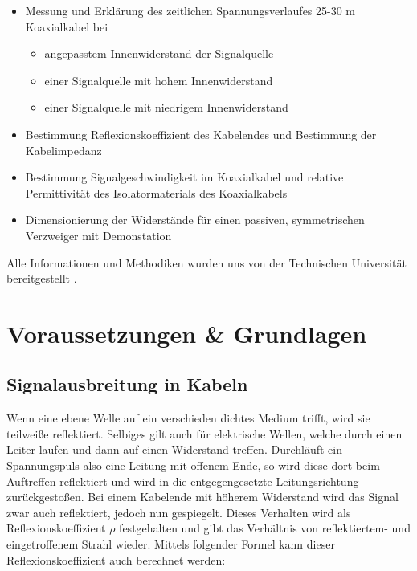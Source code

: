 \documentclass[12pt,a4paper,twoside]{article}
\begin{document}
\begin{itemize}
    \item Messung und Erklärung des zeitlichen Spannungsverlaufes 25-30 m Koaxialkabel bei
    \begin{itemize}
        \item angepasstem Innenwiderstand der Signalquelle
        \item einer Signalquelle mit hohem Innenwiderstand
        \item einer Signalquelle mit niedrigem Innenwiderstand
    \end{itemize}
    \item Bestimmung Reflexionskoeffizient des Kabelendes und Bestimmung der Kabelimpedanz
    \item Bestimmung Signalgeschwindigkeit im Koaxialkabel und relative Permittivität des Isolatormaterials des Koaxialkabels
    \item Dimensionierung der Widerstände für einen passiven, symmetrischen Verzweiger mit Demonstation
\end{itemize}

\noindent
Alle Informationen und Methodiken wurden uns von der Technischen Universität bereitgestellt \cite{teachcenter2}. 



\section{Voraussetzungen \& Grundlagen} %


\subsection{Signalausbreitung in Kabeln}

Wenn eine ebene Welle auf ein verschieden dichtes Medium trifft, wird sie teilweiße reflektiert.
Selbiges gilt auch für elektrische Wellen, welche durch einen Leiter laufen und dann auf einen Widerstand treffen. 
Durchläuft ein Spannungspuls also eine Leitung mit offenem Ende, so wird diese dort beim Auftreffen reflektiert und wird in die entgegengesetzte Leitungsrichtung zurückgestoßen.
Bei einem Kabelende mit höherem Widerstand wird das Signal zwar auch reflektiert, jedoch nun gespiegelt.
Dieses Verhalten wird als Reflexionskoeffizient $\rho$ festgehalten und gibt das Verhältnis von reflektiertem- und eingetroffenem Strahl wieder.
Mittels folgender Formel kann dieser Reflexionskoeffizient auch berechnet werden:
\end{document}
